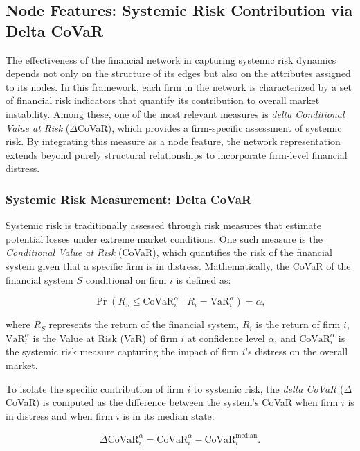 \documentclass[preprint,12pt,authoryear]{elsarticle}
\begin{document}
\subsection{Node Features: Systemic Risk Contribution via Delta CoVaR}  

The effectiveness of the financial network in capturing systemic risk dynamics depends not only on the structure of its edges but also on the attributes assigned to its nodes. In this framework, each firm in the network is characterized by a set of financial risk indicators that quantify its contribution to overall market instability. Among these, one of the most relevant measures is \textit{delta Conditional Value at Risk} (\(\Delta\)CoVaR), which provides a firm-specific assessment of systemic risk. By integrating this measure as a node feature, the network representation extends beyond purely structural relationships to incorporate firm-level financial distress.  

\subsubsection{Systemic Risk Measurement: Delta CoVaR}  

Systemic risk is traditionally assessed through risk measures that estimate potential losses under extreme market conditions. One such measure is the \textit{Conditional Value at Risk} (CoVaR), which quantifies the risk of the financial system given that a specific firm is in distress. Mathematically, the CoVaR of the financial system \( S \) conditional on firm \( i \) is defined as:

\[
\Pr \left( R_S \leq \text{CoVaR}_i^\alpha \mid R_i = \text{VaR}_i^\alpha \right) = \alpha,
\]

where \( R_S \) represents the return of the financial system, \( R_i \) is the return of firm \( i \), \( \text{VaR}_i^\alpha \) is the Value at Risk (VaR) of firm \( i \) at confidence level \( \alpha \), and \( \text{CoVaR}_i^\alpha \) is the systemic risk measure capturing the impact of firm \( i \)’s distress on the overall market.  

To isolate the specific contribution of firm \( i \) to systemic risk, the \textit{delta CoVaR} (\(\Delta\)CoVaR) is computed as the difference between the system’s CoVaR when firm \( i \) is in distress and when firm \( i \) is in its median state:

\[
\Delta \text{CoVaR}_i^\alpha = \text{CoVaR}_i^\alpha - \text{CoVaR}_i^{\text{median}}.
\]
\end{document}

